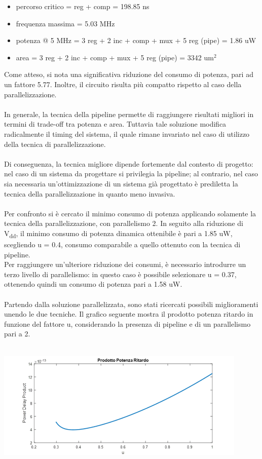 \documentclass[11pt,  english, makeidx, a4paper, titlepage, oneside]{book}
\begin{document}
\begin{itemize}
\item percorso critico = reg +  comp = 198.85 ns
\item frequenza massima = 5.03 MHz
\item potenza @ 5 MHz = 3 reg + 2 inc + comp + mux + 5 reg (pipe) = 1.86 uW
\item area = 3 reg + 2 inc + comp + mux + 5 reg (pipe) = 3342 um$^2$
\end{itemize}
\vspace{0.3cm}
Come atteso, si nota una significativa riduzione del consumo di potenza, pari ad un fattore 5.77. Inoltre, il circuito risulta più compatto rispetto al caso della parallelizzazione.
\\\\
In generale, la tecnica della pipeline permette di raggiungere risultati migliori in termini di trade-off tra potenza e area. Tuttavia tale soluzione modifica radicalmente il timing del sistema, il quale rimane invariato nel caso di utilizzo della tecnica di parallelizzazione.
\\\\
Di conseguenza, la tecnica migliore dipende fortemente dal contesto di progetto: nel caso di un sistema da progettare si privilegia la pipeline; al contrario, nel caso sia necessaria un'ottimizzazione di un sistema già progettato è prediletta la tecnica della parallelizzazione in quanto meno invasiva.
\\\\
Per confronto si è cercato il minimo consumo di potenza applicando solamente la tecnica della parallelizzazione, con parallelismo 2.  In seguito alla riduzione di V\textsubscript{dd}, il minimo consumo di potenza dinamica ottenibile è pari a 1.85 uW, scegliendo u = 0.4, consumo comparabile a quello ottenuto con la tecnica di pipeline.
\\
Per raggiungere un'ulteriore riduzione dei consumi, è necessario introdurre un terzo livello di parallelismo: in questo caso è possibile selezionare u = 0.37, ottenendo quindi un consumo di potenza pari a 1.58 uW.
\\\\
Partendo dalla soluzione parallelizzata, sono stati ricercati possibili miglioramenti unendo le due tecniche. Il grafico seguente mostra il prodotto potenza ritardo in funzione del fattore u, considerando la presenza di pipeline e di un parallelismo pari a 2.
\\\\
\centerline{\includegraphics[width=12cm]{./img/Lab_3/prodotto_potenza_ritardo.png}}
\end{document}
